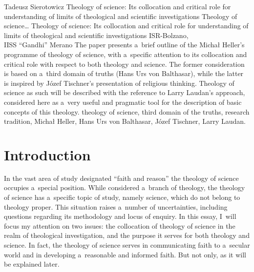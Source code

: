 \begin{artengenv}{Tadeusz Sierotowicz}
	{Theology of science: Its collocation and critical role for understanding of limits of theological and scientific investigations}
	{Theology of science\ldots}
	{Theology of science: Its collocation and critical role for understanding of limits of theological and scientific investigations}
	{ISR-Bolzano,\\IISS ``Gandhi'' Merano}
	{The paper presents a~brief outline of the Michał Heller's programme of theology of science, with a~specific attention to its collocation and critical role with respect to both theology and science. The former consideration is based on a~third domain of truths (Hans Urs von Balthasar), while the latter is inspired by Józef Tischner's presentation of religious thinking. Theology of science as such will be described with the reference to Larry Laudan's approach, considered here as a~very useful and pragmatic tool for the description of basic concepts of this theology.
	}
	{theology of science, third domain of the truths, research tradition, Michał Heller, Hans Urs von Balthasar, Józef Tischner, Larry Laudan.}





\section{Introduction }

\lettrine[loversize=0.13,lines=2,lraise=-0.03,nindent=0em,findent=0.2pt]%
{I}{}n the vast area of study designated ``faith and reason'' the theology of science occupies a~special position. While considered a~branch of theology, the theology of science has a~specific topic of study, namely science, which do not belong to theology proper. This situation raises a~number of uncertainties, including questions regarding its methodology and locus of enquiry. In this essay, I~will focus my attention on two issues: the collocation of theology of science in the realm of theological investigation, and the purpose it serves for both theology and science. In fact, the theology of science serves in communicating faith to a~secular world and in developing a~reasonable and informed faith. But not only, as it will be explained later.




\end{artengenv}
